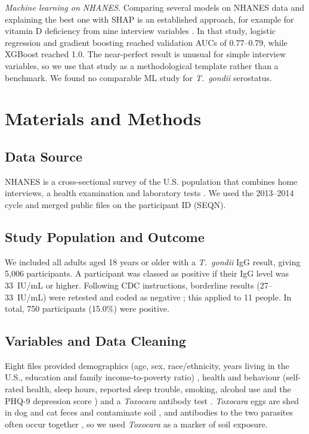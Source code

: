 \documentclass[conference]{IEEEtran}
\begin{document}
\textit{Machine learning on NHANES.} Comparing several models on NHANES data and explaining the best one with SHAP \cite{lundberg2017} is an established approach, for example for vitamin D deficiency from nine interview variables \cite{guo2024}. In that study, logistic regression and gradient boosting reached validation AUCs of 0.77--0.79, while XGBoost reached 1.0. The near-perfect result is unusual for simple interview variables, so we use that study as a methodological template rather than a benchmark. We found no comparable ML study for \textit{T.~gondii} serostatus.

\section{Materials and Methods}

\subsection{Data Source}
NHANES is a cross-sectional survey of the U.S. population that combines home interviews, a health examination and laboratory tests \cite{johnson2014}. We used the 2013--2014 cycle and merged public files on the participant ID (SEQN).

\subsection{Study Population and Outcome}
We included all adults aged 18 years or older with a \textit{T.~gondii} IgG result, giving 5,006 participants. A participant was classed as positive if their IgG level was 33~IU/mL or higher. Following CDC instructions, borderline results (27--33~IU/mL) were retested and coded as negative \cite{cdc_sstoxo}; this applied to 11 people. In total, 750 participants (15.0\%) were positive.

\subsection{Variables and Data Cleaning}
Eight files provided demographics (age, sex, race/ethnicity, years living in the U.S., education and family income-to-poverty ratio) \cite{cdc_demo}, health and behaviour (self-rated health, sleep hours, reported sleep trouble, smoking, alcohol use and the PHQ-9 depression score \cite{kroenke2001}) and a \textit{Toxocara} antibody test \cite{cdc_sstoca}. \textit{Toxocara} eggs are shed in dog and cat feces and contaminate soil \cite{healy2022}, and antibodies to the two parasites often occur together \cite{liu2018}, so we used \textit{Toxocara} as a marker of soil exposure.
\end{document}
